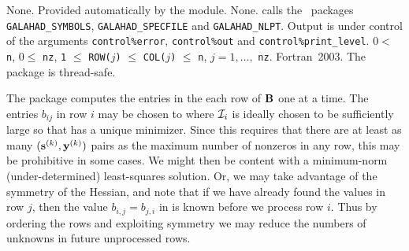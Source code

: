 \documentclass{galahad}
\newcommand{\packagename}{SHA}
\begin{document}

\galgeneral

\galcommon None.
\galworkspace Provided automatically by the module.
\galroutines None. 
\galmodules {\tt \packagename\_solve} calls the \galahad\ packages
{\tt GALAHAD\_SY\-M\-BOLS}, 
{\tt GALAHAD\_SPECFILE} and
{\tt GALAHAD\_NLPT}.
\galio Output is under control of the arguments
 {\tt control\%error}, {\tt control\%out} and {\tt control\%print\_level}.
\galrestrictions 
$0 <$ {\tt n},  $0 \le$ {\tt nz},
{\tt 1} $\le$ {\tt ROW(}$j${\tt )} $\le$ {\tt COL(}$j${\tt )} $\le$ {\tt n}, 
$j = 1, \ldots,$ {\tt nz}.
\galportability Fortran~2003. 
The package is thread-safe.


\galmethod
The package computes the entries in the each row of ${\mathbf{B}}$ one at a time.
The entries $b_{ij}$ in row $i$ may be chosen to
where ${\cal I}_i$ is ideally chosen to be sufficiently large so that 
has a unique minimizer. Since this requires that there are at least
as many $({\mathbf{s}}^{(k)}, {\mathbf{y}}^{(k)})$ pairs as the maximum number of nonzeros
in any row, this may be prohibitive in some cases. We might then be content 
with a minimum-norm (under-determined) least-squares solution. Or, we may
take advantage of the symmetry of the Hessian, and note that if we
have already found the values in row $j$, then the value $b_{i,j} = b_{j,i}$
in  is known before we process row $i$. Thus by ordering the rows 
and exploiting symmetry we may reduce the numbers of unknowns in 
future unprocessed rows.
\end{document}
